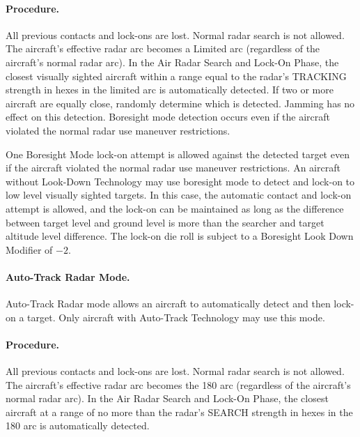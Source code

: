 \begin{advancedrules}
\paragraph{Procedure.}  All previous contacts and lock-ons are lost. Normal radar search is not allowed. The aircraft's effective radar arc becomes a Limited arc (regardless of the aircraft's normal radar arc). In the Air Radar Search and Lock-On Phase, the closest visually sighted aircraft within a range equal to the radar's TRACKING strength in hexes in the limited arc is automatically detected. If two or more aircraft are equally close, randomly determine which is detected. Jamming has no effect on this detection. Boresight mode detection occurs even if the aircraft violated the normal radar use maneuver restrictions.

One Boresight Mode lock-on attempt is allowed against the detected target even if the aircraft violated the normal radar use maneuver restrictions. An aircraft without Look-Down Technology may use boresight mode to detect and lock-on to low level visually sighted targets. In this case, the automatic contact and lock-on attempt is allowed, and the lock-on can be maintained as long as the difference between target level and ground level is more than the searcher and target altitude level difference. The lock-on die roll is subject to a Boresight Look Down Modifier of $-2$. 

\paragraph{Auto-Track Radar Mode.}\label{rule:auto-track-mode} Auto-Track Radar mode allows an aircraft to automatically detect and then lock-on a target. Only aircraft with Auto-Track Technology may use this mode. 

\paragraph{Procedure.}  All previous contacts and lock-ons are lost. Normal radar search is not allowed. The aircraft's effective radar arc becomes the 180{\deg} arc (regardless of the aircraft's normal radar arc). In the Air Radar Search and Lock-On Phase, the closest aircraft at a range of no more than the radar's SEARCH strength in hexes in the 180{\deg} arc is automatically detected.


\end{advancedrules}
